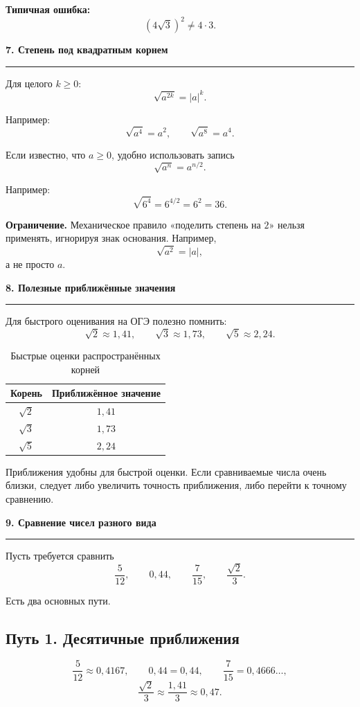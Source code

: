 \documentclass[a4paper,12pt]{article}
\newcommand{\topic}[1]{%
    \vspace{0.7em}
    {\large\bfseries\color{darkaccent}#1}\par
    \vspace{0.25em}
    {\color{rulegray}\hrule}
    \vspace{0.65em}
}
\newcommand{\important}[1]{{\bfseries\color{darkaccent}#1}}
\begin{document}
\important{Типичная ошибка:}
\[
(4\sqrt3)^2\ne4\cdot3.
\]

\topic{7. Степень под квадратным корнем}

Для целого \(k\ge0\):
\[
\boxed{\sqrt{a^{2k}}=|a|^k}.
\]

Например:
\[
\sqrt{a^4}=a^2,
\qquad
\sqrt{a^8}=a^4.
\]

Если известно, что \(a\ge0\), удобно использовать запись
\[
\sqrt{a^n}=a^{n/2}.
\]

Например:
\[
\sqrt{6^4}=6^{4/2}=6^2=36.
\]

\important{Ограничение.}
Механическое правило «поделить степень на \(2\)» нельзя применять, игнорируя знак основания. Например,
\[
\sqrt{a^2}=|a|,
\]
а не просто \(a\).

\topic{8. Полезные приближённые значения}

Для быстрого оценивания на ОГЭ полезно помнить:
\[
\boxed{\sqrt2\approx1{,}41},
\qquad
\boxed{\sqrt3\approx1{,}73},
\qquad
\boxed{\sqrt5\approx2{,}24}.
\]

\begin{table}[ht]
\centering
\caption{Быстрые оценки распространённых корней}
\renewcommand{\arraystretch}{1.25}
\begin{tabular}{cc}
\toprule
Корень & Приближённое значение \\
\midrule
\(\sqrt2\) & \(1{,}41\) \\
\(\sqrt3\) & \(1{,}73\) \\
\(\sqrt5\) & \(2{,}24\) \\
\bottomrule
\end{tabular}
\end{table}

Приближения удобны для быстрой оценки. Если сравниваемые числа очень близки, следует либо увеличить точность приближения, либо перейти к точному сравнению.

\topic{9. Сравнение чисел разного вида}

Пусть требуется сравнить
\[
\frac5{12},\qquad0{,}44,\qquad\frac7{15},\qquad\frac{\sqrt2}{3}.
\]

Есть два основных пути.

\subsection*{\color{darkaccent}Путь 1. Десятичные приближения}
\[
\frac5{12}\approx0{,}4167,
\qquad
0{,}44=0{,}44,
\qquad
\frac7{15}=0{,}4666\ldots,
\]
\[
\frac{\sqrt2}{3}\approx\frac{1{,}41}{3}\approx0{,}47.
\]
\end{document}
